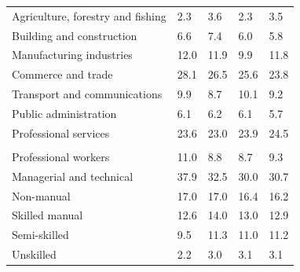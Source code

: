 \documentclass{article}
\begin{document}
\begin{table}[h]
\begin{tabular}{KTTTT}
    \hline
Agriculture, forestry and fishing  & 2.3& 3.6& 2.3& 3.5\\
Building and construction & 6.6& 7.4& 6.0& 5.8\\
Manufacturing industries & 12.0& 11.9&  9.9& 11.8\\
Commerce and trade  & 28.1& 26.5& 25.6& 23.8\\
Transport and communications  &  9.9&  8.7& 10.1&  9.2\\
Public administration & 6.1& 6.2& 6.1& 5.7\\
Professional services & 23.6& 23.0& 23.9& 24.5\\
\hline
    \\ 
    \hline
Professional workers  & 11.0&  8.8 &  8.7&  9.3\\
Managerial and technical & 37.9& 32.5& 30.0& 30.7\\
Non-manual & 17.0& 17.0& 16.4& 16.2\\
Skilled manual & 12.6& 14.0& 13.0& 12.9\\
Semi-skilled &  9.5& 11.3& 11.0& 11.2\\
Unskilled  & 2.2& 3.0& 3.1& 3.1\\
\end{tabular}
\end{table}
\pagebreak
\end{document}

